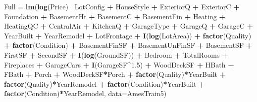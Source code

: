 \documentclass[
]{article}
\newenvironment{Shaded}{\begin{snugshade}}{\end{snugshade}}
\newcommand{\DataTypeTok}[1]{\textcolor[rgb]{0.13,0.29,0.53}{#1}}
\newcommand{\FloatTok}[1]{\textcolor[rgb]{0.00,0.00,0.81}{#1}}
\newcommand{\KeywordTok}[1]{\textcolor[rgb]{0.13,0.29,0.53}{\textbf{#1}}}
\newcommand{\NormalTok}[1]{#1}
\newcommand{\OperatorTok}[1]{\textcolor[rgb]{0.81,0.36,0.00}{\textbf{#1}}}
\newcommand{\StringTok}[1]{\textcolor[rgb]{0.31,0.60,0.02}{#1}}
\begin{document}
\begin{Shaded}
\begin{Highlighting}[]
\NormalTok{Full =}\StringTok{ }\KeywordTok{lm}\NormalTok{(}\KeywordTok{log}\NormalTok{(Price)}\OperatorTok{~}
\StringTok{            }\NormalTok{LotConfig }\OperatorTok{+}\StringTok{ }\NormalTok{HouseStyle }\OperatorTok{+}\StringTok{ }\NormalTok{ExteriorQ }\OperatorTok{+}\StringTok{ }\NormalTok{ExteriorC }\OperatorTok{+}\StringTok{ }\NormalTok{Foundation }\OperatorTok{+}\StringTok{ }\NormalTok{BasementHt }\OperatorTok{+}\StringTok{ }\NormalTok{BasementC }\OperatorTok{+}\StringTok{ }\NormalTok{BasementFin }\OperatorTok{+}\StringTok{ }\NormalTok{Heating }\OperatorTok{+}\StringTok{ }\NormalTok{HeatingQC }\OperatorTok{+}\StringTok{ }\NormalTok{CentralAir }\OperatorTok{+}\StringTok{ }\NormalTok{KitchenQ }\OperatorTok{+}\StringTok{ }\NormalTok{GarageType }\OperatorTok{+}\StringTok{ }\NormalTok{GarageQ }\OperatorTok{+}\StringTok{ }\NormalTok{GarageC }\OperatorTok{+}\StringTok{ }\NormalTok{YearBuilt }\OperatorTok{+}\StringTok{ }\NormalTok{YearRemodel }\OperatorTok{+}\StringTok{ }\NormalTok{LotFrontage }\OperatorTok{+}\StringTok{ }\KeywordTok{I}\NormalTok{(}\KeywordTok{log}\NormalTok{(LotArea)) }\OperatorTok{+}\StringTok{ }\KeywordTok{factor}\NormalTok{(Quality) }\OperatorTok{+}\StringTok{ }\KeywordTok{factor}\NormalTok{(Condition) }\OperatorTok{+}\StringTok{ }\NormalTok{BasementFinSF }\OperatorTok{+}\StringTok{ }\NormalTok{BasementUnFinSF }\OperatorTok{+}\StringTok{ }\NormalTok{BasementSF }\OperatorTok{+}\StringTok{ }\NormalTok{FirstSF }\OperatorTok{+}\StringTok{ }\NormalTok{SecondSF }\OperatorTok{+}\StringTok{ }\KeywordTok{I}\NormalTok{(}\KeywordTok{log}\NormalTok{(GroundSF)) }\OperatorTok{+}\StringTok{ }\NormalTok{Bedroom }\OperatorTok{+}\StringTok{ }\NormalTok{TotalRooms }\OperatorTok{+}\StringTok{ }\NormalTok{Fireplaces }\OperatorTok{+}\StringTok{ }\NormalTok{GarageCars }\OperatorTok{+}\StringTok{ }\KeywordTok{I}\NormalTok{(GarageSF}\OperatorTok{^}\FloatTok{1.5}\NormalTok{) }\OperatorTok{+}\StringTok{ }\NormalTok{WoodDeckSF }\OperatorTok{+}\StringTok{ }\NormalTok{HBath }\OperatorTok{+}\StringTok{ }\NormalTok{FBath }\OperatorTok{+}\StringTok{ }\NormalTok{Porch }\OperatorTok{+}\StringTok{ }\NormalTok{WoodDeckSF}\OperatorTok{*}\NormalTok{Porch }\OperatorTok{+}\StringTok{ }\KeywordTok{factor}\NormalTok{(Quality)}\OperatorTok{*}\NormalTok{YearBuilt }\OperatorTok{+}\StringTok{ }\KeywordTok{factor}\NormalTok{(Quality)}\OperatorTok{*}\NormalTok{YearRemodel }\OperatorTok{+}\StringTok{ }\KeywordTok{factor}\NormalTok{(Condition)}\OperatorTok{*}\NormalTok{YearBuilt }\OperatorTok{+}\StringTok{ }\KeywordTok{factor}\NormalTok{(Condition)}\OperatorTok{*}\NormalTok{YearRemodel, }\DataTypeTok{data=}\NormalTok{AmesTrain5)}
\end{Highlighting}
\end{Shaded}
\end{document}
